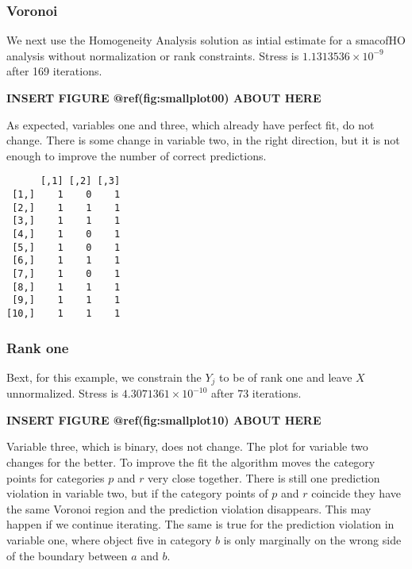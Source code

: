 \documentclass[
  12pt,
  letterpaper,
  DIV=11,
  numbers=noendperiod]{scrartcl}
\begin{document}
\subsubsection{Voronoi}\label{voronoi}

We next use the Homogeneity Analysis solution as intial estimate for a
smacofHO analysis without normalization or rank constraints. Stress is
\ensuremath{1.1313536\times 10^{-9}} after 169 iterations.

\begin{greybox}

\begin{center}
\textbf{INSERT FIGURE @ref(fig:smallplot00) ABOUT HERE}

\end{center}

\end{greybox}

As expected, variables one and three, which already have perfect fit, do
not change. There is some change in variable two, in the right
direction, but it is not enough to improve the number of correct
predictions.

\begin{verbatim}
      [,1] [,2] [,3]
 [1,]    1    0    1
 [2,]    1    1    1
 [3,]    1    1    1
 [4,]    1    0    1
 [5,]    1    0    1
 [6,]    1    1    1
 [7,]    1    0    1
 [8,]    1    1    1
 [9,]    1    1    1
[10,]    1    1    1
\end{verbatim}

\subsubsection{Rank one}\label{rank-one}

Bext, for this example, we constrain the \(Y_j\) to be of rank one and
leave \(X\) unnormalized. Stress is
\ensuremath{4.3071361\times 10^{-10}} after 73 iterations.

\begin{greybox}

\begin{center}
\textbf{INSERT FIGURE @ref(fig:smallplot10) ABOUT HERE}

\end{center}

\end{greybox}

Variable three, which is binary, does not change. The plot for variable
two changes for the better. To improve the fit the algorithm moves the
category points for categories \(p\) and \(r\) very close together.
There is still one prediction violation in variable two, but if the
category points of \(p\) and \(r\) coincide they have the same Voronoi
region and the prediction violation disappears. This may happen if we
continue iterating. The same is true for the prediction violation in
variable one, where object five in category \(b\) is only marginally on
the wrong side of the boundary between \(a\) and \(b\).
\end{document}
